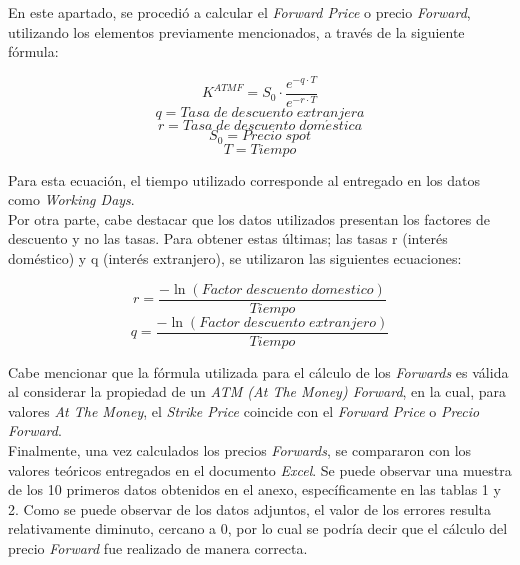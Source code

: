 En este apartado, se procedió a calcular el \textit{Forward Price} o precio \textit{Forward}, utilizando los elementos previamente mencionados, a través de la siguiente fórmula:

\begin{equation}
    K^{ATMF}=S_0 \cdot \frac{e^{-q \cdot T}}{e^{-r \cdot T}}
\end{equation}
\begin{equation*}
    q=Tasa\;de\;descuento\;extranjera
\end{equation*}
\begin{equation*}
     r=Tasa\;de\;descuento\;dom\acute{e}stica
\end{equation*}
\begin{equation*}
    S_0=Precio\;spot
\end{equation*}
\begin{equation*}
    T=Tiempo
\end{equation*}

\noindent Para esta ecuación, el tiempo utilizado corresponde al entregado en los datos como \textit{Working Days}.\\

\noindent Por otra parte, cabe destacar que los datos utilizados presentan los factores de descuento y no las tasas. Para obtener estas últimas; las tasas r (interés doméstico) y q (interés extranjero), se utilizaron las siguientes ecuaciones:

\begin{equation}
    r=\frac{-\ln({Factor\;descuento\;domestico})}{Tiempo}
\end{equation}
\begin{equation}
    q=\frac{-\ln({Factor\;descuento\;extranjero})}{Tiempo}
\end{equation}

\noindent Cabe mencionar que la fórmula utilizada para el cálculo de los \textit{Forwards} es válida al considerar la propiedad de un \textit{ATM (At The Money) Forward}, en la cual, para valores \textit{At The Money}, el \textit{Strike Price} coincide con el \textit{Forward Price} o \textit{Precio Forward}.\\

\noindent Finalmente, una vez calculados los precios \textit{Forwards}, se compararon con los valores teóricos entregados en el documento \textit{Excel}. Se puede observar una muestra de los 10 primeros datos obtenidos en el anexo, específicamente en las tablas 1 y 2. Como se puede observar de los datos adjuntos, el valor de los errores resulta relativamente diminuto, cercano a 0, por lo cual se podría decir que el cálculo del precio \textit{Forward} fue realizado de manera correcta. 
\newpage
  

